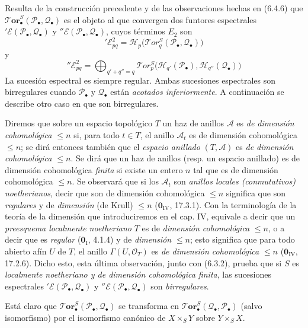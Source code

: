\begin{env}[6.5.4]
Resulta de la construcción precedente y de las observaciones hechas en (6.4.6) que $\boldsymbol{\mathscr{T}\!or}_\bullet^S(\mathscr P_\bullet,\mathscr Q_\bullet)$ es el objeto al
que convergen dos funtores espectrales
$'\mathscr E(\mathscr P_\bullet,\mathscr Q_\bullet)$ y
$''\mathscr E(\mathscr P_\bullet,\mathscr Q_\bullet)$, cuyos términos $E_2$ son
\[
  '\mathscr E_{pq}^2
  =\mathscr H_p\bigl(\mathscr{T}\!or_q^S
    (\mathscr P_\bullet,\mathscr Q_\bullet)\bigr)
  \tag{6.5.4.1}\label{III.6.5.4.1.fr}
\]
y
\[
  ''\mathscr E_{pq}^2
  =\bigoplus_{q'+q''=q}
   \mathscr{T}\!or_p^S
   \bigl(\mathscr H_{q'}(\mathscr P_\bullet),
         \mathscr H_{q''}(\mathscr Q_\bullet)\bigr)
  \tag{6.5.4.2}\label{III.6.5.4.2.fr}
\]
La sucesión espectral  es siempre regular.
Ambas sucesiones espectrales son birregulares cuando
$\mathscr P_\bullet$ y $\mathscr Q_\bullet$ están \emph{acotados inferiormente}.
A continuación se describe otro caso en que son birregulares.
\end{env}

\begin{env}[6.5.5]
Diremos que sobre un espacio topológico $T$ un haz de anillos
$\mathscr A$ es \emph{de dimensión cohomológica $\leqslant n$} si, para todo
$t\in T$, el anillo $\mathscr A_t$ es de dimensión cohomológica $\leqslant n$;
se dirá entonces también que el \emph{espacio anillado} $(T,\mathscr A)$ es
\emph{de dimensión cohomológica $\leqslant n$}. Se dirá que un haz
de anillos (resp. un espacio anillado) es de dimensión cohomológica \emph{finita}
si existe un entero $n$ tal que es de dimensión cohomológica
$\leqslant n$. Se observará que si los $\mathscr A_t$ son \emph{anillos locales
(conmutativos) noetherianos},
decir que son de dimensión cohomológica $\leqslant n$ significa que son
\emph{regulares} y de \emph{dimensión} (de Krull) $\leqslant n$ ($\mathbf{0}_{\mathrm{IV}}$, 17.3.1).
Con la terminología de la teoría de la dimensión que introduciremos en el
cap. IV, equivale a decir que un \emph{preesquema localmente noetheriano} $T$
es de \emph{dimensión cohomológica} $\leqslant n$, o a decir que es \emph{regular}
($\mathbf{0}_{\mathrm I}$, 4.1.4) y de \emph{dimensión} $\leqslant n$; esto significa que para
todo abierto afín $U$ de $T$, el anillo $\Gamma(U,\mathscr O_T)$ es \emph{de
dimensión cohomológica} $\leqslant n$ ($\mathbf{0}_{\mathrm{IV}}$, 17.2.6). Dicho esto,
esta última observación, junto con (6.3.2), prueba que si $S$ es \emph{localmente
noetheriano y de dimensión cohomológica finita}, las sucesiones espectrales
$'\mathscr E(\mathscr P_\bullet,\mathscr Q_\bullet)$ y
$''\mathscr E(\mathscr P_\bullet,\mathscr Q_\bullet)$ son \emph{birregulares}.

Está claro que
$\boldsymbol{\mathscr{T}\!or}_\bullet^S(\mathscr P_\bullet,\mathscr Q_\bullet)$ se
transforma en
$\boldsymbol{\mathscr{T}\!or}_\bullet^S(\mathscr Q_\bullet,\mathscr P_\bullet)$ (salvo
isomorfismo) por el isomorfismo canónico de $X\times_S Y$ sobre
$Y\times_S X$.
\end{env}

